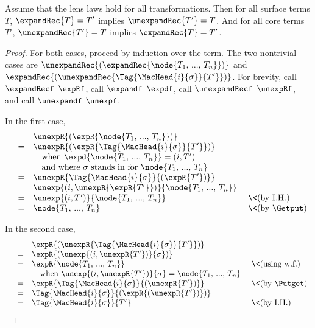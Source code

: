 \begin{thm}
\label{thm:reval-exp}
Assume that the lens laws hold for all transformations. Then for all
surface terms $T$, $\expandRec{T} = T'$ implies $\unexpandRec{T'} =
T$. And for all core terms $T'$, $\unexpandRec{T'} = T$ implies
$\expandRec{T} = T'$.
\end{thm}
\begin{proof}
For both cases, proceed by induction over the term. The two nontrivial
cases are $\unexpandRec{(\expandRec{\node{T_1,\,...,\,T_n}})}$ and
$\expandRec{(\unexpandRec{\Tag{\MacHead{i}{\sigma}}{T'}})}$. For brevity, call
$\expandRecf$ $\expRf$, call $\expandf$ $\expdf$, call $\unexpandRecf$
$\unexpRf$, and call $\unexpandf$ $\unexpf$.

In the first case,
\[\begin{array}{llll}
  &&  \unexpR{(\expR{\node{T_1,\,...,\,T_n}})} \\
  &=& \unexpR{(\expR{\Tag{\MacHead{i}{\sigma}}{T'}})} \\
  &&  \ \ \text{ when }
        \expd{\node{T_1,\,...,\,T_n}} = (i, T') \\
  &&  \ \ \text{ and where $\sigma$ stands in for
          $\node{T_1,\,...,\,T_n}$} \\
  &=& \unexpR{\Tag{\MacHead{i}{\sigma}}{(\expR{T'})}} \\
  &=& \unexp{(i, \unexpR{\expR{T'}})}{\node{T_1,\,...,\,T_n}} \\
  &=& \unexp{(i, T')}{\node{T_1,\,...,\,T_n}} & \text{ \<(by I.H.)} \\
  &=& \node{T_1,\,...,\,T_n} &\text{ \<(by \Getput)}
\end{array}\]

In the second case,
\[\begin{array}{llll}
  && \expR{(\unexpR{\Tag{\MacHead{i}{\sigma}}{T'}})} \\
  &=& \expR{(\unexp{(i, \unexpR{T'})}{\sigma})} \\
  &=& \expR{\node{T_1,\,...,\,T_n}} &\text{ \<(using w.f.)} \\
    && \ \ \text{ when }
       \unexp{(i, \unexpR{T'})}{\sigma} = \node{T_1,\,...,\,T_n} \\
  &=& \expR{\Tag{\MacHead{i}{\sigma}}{(\unexpR{T'})}}
    &\text{ \<(by \Putget)} \\
  &=& \Tag{\MacHead{i}{\sigma}}{(\expR{(\unexpR{T'})})} \\
  &=& \Tag{\MacHead{i}{\sigma}}{T'}
    &\text{ \<(by I.H.)}
\end{array}\]
\end{proof}


